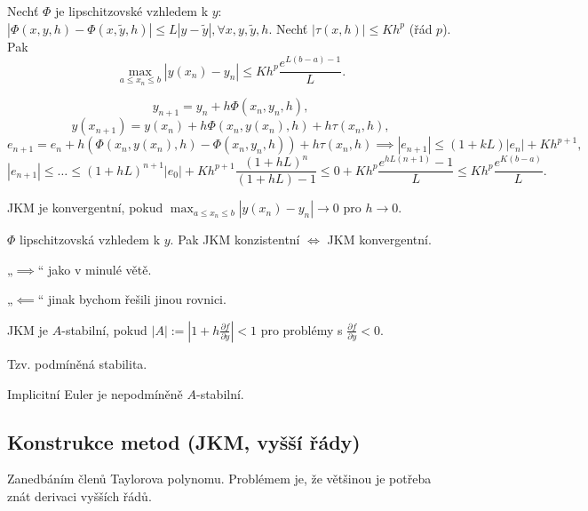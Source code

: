 \documentclass[12pt]{article}					%
\begin{document}
\begin{veta}
	Nechť $\Phi$ je lipschitzovské vzhledem k $y$: $|\Phi(x, y, h) - \Phi(x, \tilde y, h)| ≤ L|y - \tilde y|, \forall x, y, \tilde y, h$. Nechť $|\tau(x, h)| ≤ Kh^p$ (řád $p$). Pak
	$$ \max_{a ≤ x_n ≤ b} |y(x_n) - y_n| ≤ K h^p \frac{e^{L(b - a) - 1}}{L}. $$

	\begin{dukazin}
		$$ y_{n+1} = y_n + h \Phi(x_n, y_n, h), $$
		$$ y(x_{n+1}) = y(x_n) + h \Phi(x_n, y(x_n), h) + h\tau(x_n, h), $$
		$$ e_{n+1} = e_n + h(\Phi(x_n, y(x_n), h) - \Phi(x_n, y_n, h)) + h \tau(x_n, h) \implies |e_{n+1}| ≤ (1 + kL) |e_n| + Kh^{p + 1}, $$
		$$ |e_{n+1}| ≤ … ≤ (1+hL)^{n+1} |e_0| + Kh^{p+1} \frac{(1 + hL)^n}{(1 + hL) - 1} ≤ 0 + Kh^p \frac{e^{hL(n+1)} - 1}{L} ≤ Kh^p \frac{e^{K(b - a)}}{L}. $$
	\end{dukazin}
\end{veta}

\begin{definice}
	JKM je konvergentní, pokud $\max_{a ≤ x_n ≤ b} |y(x_n) - y_n| \rightarrow 0$ pro $h \rightarrow 0$.
\end{definice}

\begin{veta}
	$\Phi$ lipschitzovská vzhledem k $y$. Pak JKM konzistentní $\Leftrightarrow$ JKM konvergentní.

	\begin{dukazin}
		„$\implies$“ jako v minulé větě.

		„$\impliedby$“ jinak bychom řešili jinou rovnici.
	\end{dukazin}
\end{veta}

\begin{definice}
	JKM je $A$-stabilní, pokud $|A| := |1 + h\frac{\partial f}{\partial y}| < 1$ pro problémy s $\frac{\partial f}{\partial y} < 0$.

	Tzv. podmíněná stabilita.

	\begin{prikladyin}
		Implicitní Euler je nepodmíněně $A$-stabilní.
	\end{prikladyin}
\end{definice}

	\subsection{Konstrukce metod (JKM, vyšší řády)}
	\begin{definice}
		Zanedbáním členů Taylorova polynomu. Problémem je, že většinou je potřeba znát derivaci vyšších řádů.
	\end{definice}
\end{document}
